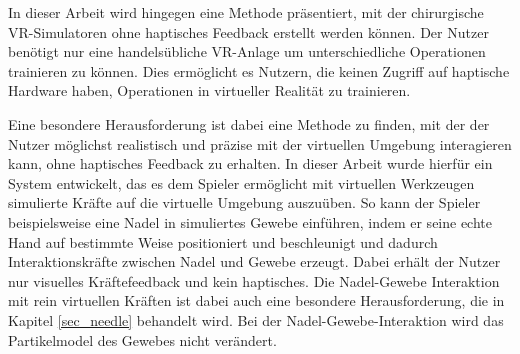 In dieser Arbeit wird hingegen eine Methode präsentiert, mit der chirurgische VR-Simulatoren ohne haptisches Feedback erstellt werden können. Der Nutzer benötigt nur eine handelsübliche VR-Anlage 
um unterschiedliche Operationen trainieren zu können. 
Dies ermöglicht es Nutzern, die keinen Zugriff auf haptische Hardware haben, Operationen in virtueller Realität zu trainieren. 

Eine besondere Herausforderung ist dabei eine Methode zu finden, mit der der Nutzer möglichst realistisch und präzise mit der virtuellen Umgebung interagieren kann, ohne haptisches Feedback zu erhalten. In dieser Arbeit wurde hierfür ein System entwickelt, das es dem Spieler ermöglicht mit virtuellen Werkzeugen simulierte Kräfte auf die virtuelle Umgebung auszuüben. So kann der Spieler beispielsweise eine Nadel in simuliertes Gewebe einführen, indem er seine echte Hand auf bestimmte Weise positioniert und beschleunigt und dadurch Interaktionskräfte zwischen Nadel und Gewebe erzeugt. 
Dabei erhält der Nutzer nur visuelles Kräftefeedback und kein haptisches.
Die Nadel-Gewebe Interaktion mit rein virtuellen Kräften ist dabei auch eine besondere Herausforderung, die in Kapitel \ref{sec_needle} behandelt wird. 
Bei der Nadel-Gewebe-Interaktion wird das Partikelmodel des Gewebes nicht verändert. 








